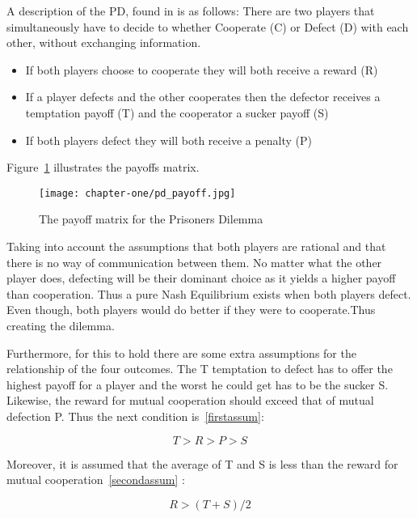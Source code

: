 A description of the PD, found in \cite{Li2011} is as follows:
There are two players that simultaneously have to decide to whether Cooperate (C)
or Defect (D) with each other, without exchanging information.

\begin{itemize}
  \item If both players choose to cooperate they will both receive a reward (R)
  \item If a player defects and the other cooperates then the defector receives
  a temptation payoff (T) and the cooperator a sucker payoff (S)
  \item If both players defect they will both receive a penalty (P)
\end{itemize}

Figure~\ref{fig:pd_payoff} illustrates the payoffs matrix.

\begin{figure}[h!]
    \centering
    \texttt{[image: chapter-one/pd\_payoff.jpg]}
    \caption{The payoff matrix for the Prisoners Dilemma}
    \label{fig:pd_payoff}
\end{figure}

Taking into account the assumptions that both players are rational
and that there is no way of communication between them. No matter what the
other player does, defecting will be their dominant choice as it yields a higher
payoff than cooperation.
Thus a pure Nash Equilibrium exists when both players defect. Even though, both
players would do better if they were to cooperate.Thus creating the dilemma.

Furthermore, for this to hold there are some extra assumptions for the
relationship of the four outcomes. The T temptation to defect has to offer the
highest payoff for a player and the worst he could get has to be the sucker S.
Likewise, the reward for mutual cooperation should exceed that of mutual
defection P. Thus the next condition is~\ref{firstassum}:

\begin{equation}\label{firstassum}
 T > R > P > S
\end{equation}

Moreover, it is assumed that the average of T and S is less than the reward for
mutual cooperation~\ref{secondassum} :

\begin{equation}\label{secondassum}
    R > (T+S)/2
\end{equation}

